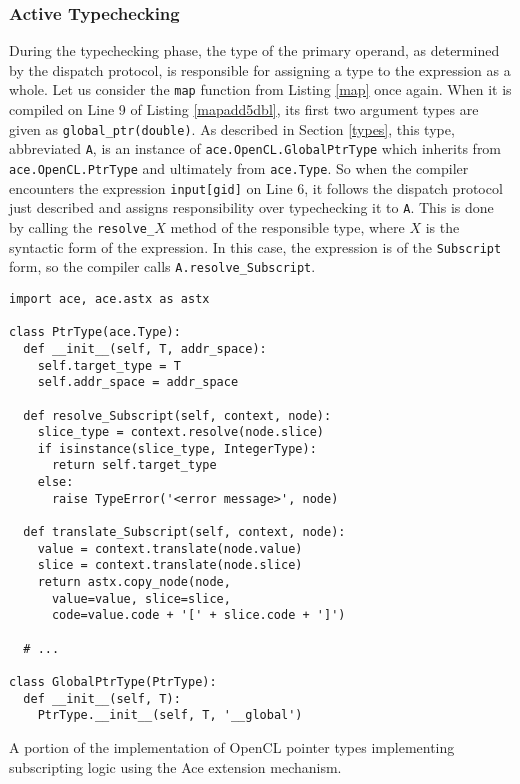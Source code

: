 \documentclass[10pt, conference, compsocconf]{IEEEtran}
\begin{document}
\subsubsection{Active Typechecking}
During the typechecking phase, the type of the primary operand, as determined by the dispatch protocol, is responsible for assigning a type to the expression as a whole. Let us consider the \verb|map| function from Listing \ref{map} once again. When it is compiled on Line 9 of Listing \ref{mapadd5dbl}, its first two argument types are given as \verb|global_ptr(double)|. As described in Section \ref{types}, this type, abbreviated \verb|A|, is an instance of \verb|ace.OpenCL.GlobalPtrType| which inherits from \verb|ace.OpenCL.PtrType| and ultimately from \verb|ace.Type|. So when the compiler encounters the expression \verb|input[gid]| on Line 6, it follows the dispatch protocol just described and assigns responsibility over typechecking it to \verb|A|. This is done by calling the \verb|resolve_|$X$ method of the responsible type, where $X$ is the syntactic form of the expression. In this case, the expression is of the \verb|Subscript| form, so the compiler calls \verb|A.resolve_Subscript|.


\begin{codelisting}
\begin{lstlisting}
import ace, ace.astx as astx

class PtrType(ace.Type):
  def __init__(self, T, addr_space):
    self.target_type = T
    self.addr_space = addr_space
        
  def resolve_Subscript(self, context, node):
    slice_type = context.resolve(node.slice)
    if isinstance(slice_type, IntegerType):
      return self.target_type
    else:
      raise TypeError('<error message>', node)
       
  def translate_Subscript(self, context, node):
    value = context.translate(node.value)
    slice = context.translate(node.slice)
    return astx.copy_node(node, 
      value=value, slice=slice,    
      code=value.code + '[' + slice.code + ']')
      
  # ...
   
class GlobalPtrType(PtrType):
  def __init__(self, T):
    PtrType.__init__(self, T, '__global')
\end{lstlisting}
\caption{A portion of the implementation of OpenCL pointer types implementing subscripting logic using the Ace extension mechanism.}
\label{pointers}
\end{codelisting}
\end{document}
